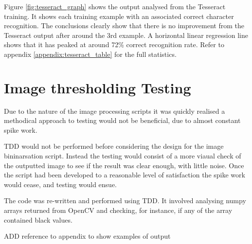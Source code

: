 Figure \ref{fig:tesseract_graph} shows the output analysed from the Tesseract training. It shows each training example with an associated correct character recognition. The conclusions clearly show that there is no improvement from the Tesseract output after around the 3rd example. A horizontal linear regression line shows that it has peaked at around 72\% correct recognition rate. Refer to appendix \ref{appendix:tesseract_table} for the full statistics.

\section{Image thresholding Testing}
Due to the nature of the image processing scripts it was quickly realised a methodical approach to testing would not be beneficial, due to almost constant spike work.

TDD would not be performed before considering the design for the image bininarsation script. Instead the testing would consist of a more viaual check of the outputted image to see if the result was clear enough, with little noise. Once the script had been developed to a reasonable level of satisfaction the spike work would cease, and testing would ensue.

The code was re-written and performed using TDD. It involved analysing numpy arrays returned from OpenCV and checking, for instance, if any of the array contained black values.

ADD reference to appendix to show examples of output
